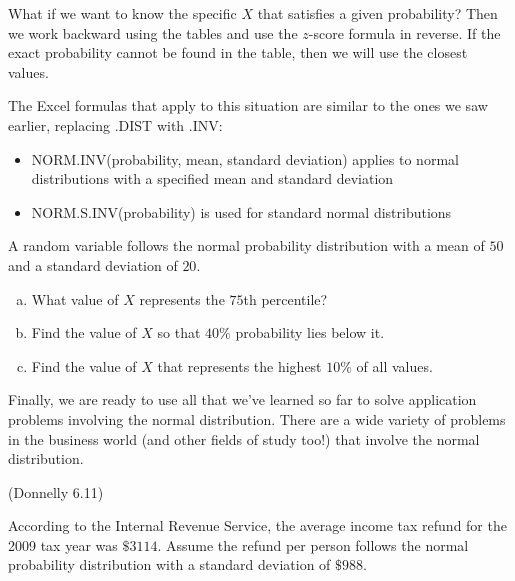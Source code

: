 \documentclass[12pt, letterpaper]{article}
\newcounter{exercise}
\theoremstyle{definition}
\begin{document}
\newpage

What if we want to know the specific $X$ that satisfies a given probability?  Then we work backward using the tables and use the $z$-score formula in reverse.  If the exact probability cannot be found in the table, then we will use the closest values.

\vspace*{.2in}

The Excel formulas that apply to this situation are similar to the ones we saw earlier, replacing .DIST with .INV:
\begin{itemize}
\item NORM.INV(probability, mean, standard deviation) applies to normal distributions with a specified mean and standard deviation 
\item NORM.S.INV(probability) is used for standard normal distributions
\end{itemize}


\begin{exercise}
A random variable follows the normal probability distribution with a mean of $50$ and a standard deviation of $20$.
\end{exercise}

\begin{enumerate}[(a)]

\item What value of $X$ represents the $75$th percentile?

\vfill

\item Find the value of $X$ so that $40\%$ probability lies below it.

\vfill

\item Find the value of $X$ that represents the highest $10\%$ of all values.

\vfill

\end{enumerate}

\newpage

\noindent Finally, we are ready to use all that we've learned so far to solve application problems involving the normal distribution.  There are a wide variety of problems in the business world (and other fields of study too!) that involve the normal distribution.

\begin{exercise}  (Donnelly 6.11)

According to the Internal Revenue Service, the average income tax refund for the 2009 tax year was $\$3114$.  Assume the refund per person follows the normal probability distribution with a standard deviation of $\$988$.

\end{exercise}
\end{document}
